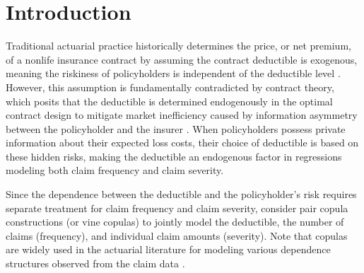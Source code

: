 \documentclass[11pt]{article}
\begin{document}
\newpage
\section{Introduction}
\label{sec:intro}

Traditional actuarial practice historically determines the price, or net premium, of a nonlife insurance contract by assuming the contract deductible is exogenous, meaning the riskiness of policyholders is independent of the deductible level \citep{Klugman2012}. However, this assumption is fundamentally contradicted by contract theory, which posits that the deductible is determined endogenously in the optimal contract design to mitigate market inefficiency caused by information asymmetry between the policyholder and the insurer \citep{Bolton2005contract}. When policyholders possess private information about their expected loss costs, their choice of deductible is based on these hidden risks, making the deductible an endogenous factor in regressions modeling both claim frequency and claim severity. %

 
Since the dependence between the deductible and the policyholder's risk requires separate treatment for claim frequency and claim severity, \citet{shi2022copula} consider pair copula constructions (or vine copulas) to jointly model the deductible, the number of claims (frequency), and individual claim amounts (severity). Note that copulas are widely used in the actuarial literature for modeling various dependence structures observed from the claim data \citep{FreesValdez1998, ShiLu2018, jeong2023multivariate}.
\end{document}
